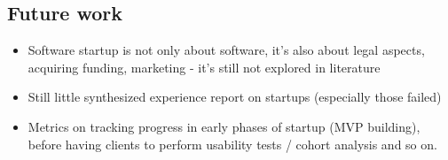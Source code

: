 \documentclass{article}
\begin{document}
\subsection{Future work}
\begin{itemize}
  \item Software startup is not only about software, it's also about legal aspects, acquiring funding, marketing - it's still not explored in literature
  \item Still little synthesized experience report on startups (especially those failed)
  \item Metrics on tracking progress in early phases of startup (MVP building), before having clients to perform usability tests / cohort analysis and so on.
  \end{itemize}
\newpage
\listoffigures

 
\end{document}
